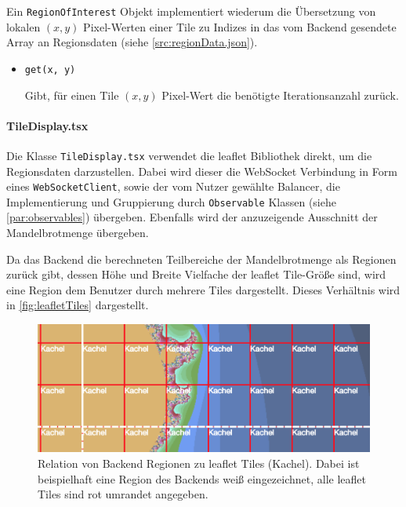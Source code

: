 Ein \verb|RegionOfInterest| Objekt implementiert wiederum die Übersetzung von lokalen \( (x,y) \) Pixel-Werten
einer Tile zu Indizes in das vom Backend gesendete Array an Regionsdaten (siehe \autoref{src:regionData.json}).
\begin{itemize}
	\item \verb|get(x, y)|

	      Gibt, für einen Tile \( (x,y) \) Pixel-Wert die benötigte Iterationsanzahl zurück.
\end{itemize}


\paragraph{TileDisplay.tsx}
Die Klasse \verb|TileDisplay.tsx| verwendet die leaflet Bibliothek direkt, um die Regionsdaten darzustellen.
Dabei wird dieser die WebSocket Verbindung in Form eines \verb|WebSocketClient|, sowie der vom Nutzer gewählte Balancer,
die Implementierung und Gruppierung durch \verb|Observable| Klassen (siehe \autoref{par:observables}) übergeben. Ebenfalls wird der anzuzeigende Ausschnitt der
Mandelbrotmenge übergeben.

Da das Backend die berechneten Teilbereiche der Mandelbrotmenge als Regionen zurück gibt, dessen Höhe und Breite
Vielfache der leaflet Tile-Größe sind, wird eine Region dem Benutzer durch mehrere Tiles dargestellt.
Dieses Verhältnis wird in \autoref{fig:leafletTiles} dargestellt.

\begin{figure}
	\centering
	\includegraphics[width=0.5\linewidth]{img/Implementierung/leafletTiles}
	\caption{Relation von Backend Regionen zu leaflet Tiles (Kachel).
		Dabei ist beispielhaft eine Region des Backends
		weiß eingezeichnet, alle leaflet Tiles sind rot umrandet angegeben.
	}\label{fig:leafletTiles}
\end{figure}

